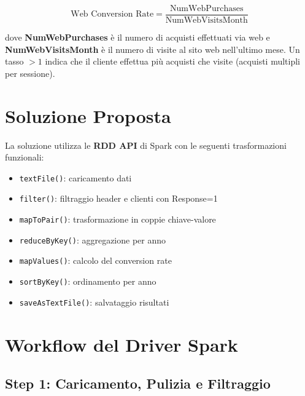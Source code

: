 \documentclass[a4paper, 12pt, oneside]{report}
\begin{document}
\begin{equation}
    \text{Web Conversion Rate} = \frac{\text{NumWebPurchases}}{\text{NumWebVisitsMonth}}
\end{equation}

dove \textbf{NumWebPurchases} \`e il numero di acquisti effettuati via web e \textbf{NumWebVisitsMonth} \`e il numero di visite al sito web nell'ultimo mese. Un tasso $> 1$ indica che il cliente effettua pi\`u acquisti che visite (acquisti multipli per sessione).

\section{Soluzione Proposta}

La soluzione utilizza le \textbf{RDD API} di Spark con le seguenti trasformazioni funzionali:

\begin{tcolorbox}[colback=orange!5,colframe=orange!40!black,title=Operazioni RDD Utilizzate]
\begin{itemize}
    \item \texttt{textFile()}: caricamento dati
    \item \texttt{filter()}: filtraggio header e clienti con Response=1
    \item \texttt{mapToPair()}: trasformazione in coppie chiave-valore
    \item \texttt{reduceByKey()}: aggregazione per anno
    \item \texttt{mapValues()}: calcolo del conversion rate
    \item \texttt{sortByKey()}: ordinamento per anno
    \item \texttt{saveAsTextFile()}: salvataggio risultati
\end{itemize}
\end{tcolorbox}

\section{Workflow del Driver Spark}

\subsection{Step 1: Caricamento, Pulizia e Filtraggio}
\end{document}

